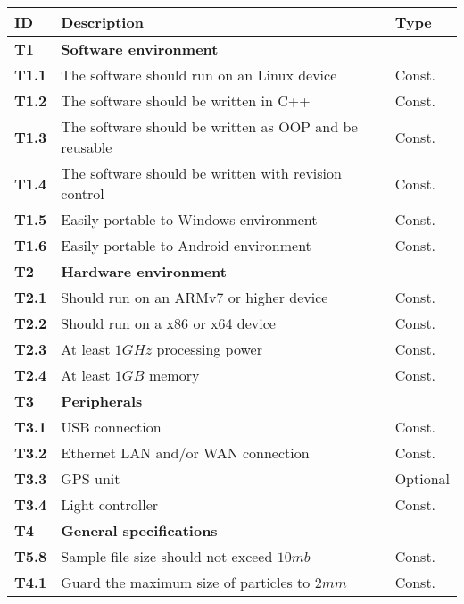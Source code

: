 \documentclass[11pt,fleqn,,a4paper,twoside,openright]{book}
\begin{document}
\begin{longtable}{|p{1cm}| p{10cm} p{1.5cm}|}
\hline 
\textbf{ID} & \textbf{Description} & \textbf{Type} \\ 
\endhead
\hline 
\textbf{T1}\label{T1} & \textbf{Software environment} &  \\ 
\hline 
\textbf{T1.1}\label{T1.1} & The software should run on an Linux device & Const. \\ 
\hline 
\textbf{T1.2}\label{T1.2} & The software should be written in C++ & Const. \\ 
\hline 
\textbf{T1.3}\label{T1.3} & The software should be written as OOP and be reusable & Const. \\ 
\hline 
\textbf{T1.4}\label{T1.4} & The software should be written with revision control & Const. \\
\hline 
\textbf{T1.5}\label{T1.5} & Easily portable to Windows environment & Const. \\
\hline 
\textbf{T1.6}\label{T1.6} & Easily portable to Android environment & Const. \\
\hline 
\textbf{T2}\label{T2} & \textbf{Hardware environment} &  \\ 
\hline 
\textbf{T2.1}\label{T2.1} & Should run on an ARMv7 or higher device &  Const. \\ 
\hline 
\textbf{T2.2}\label{T2.2} & Should run on a x86 or x64 device & Const. \\
\hline 
\textbf{T2.3}\label{T2.3} & At least $1 GHz$ processing power & Const. \\
\hline 
\textbf{T2.4}\label{T2.4} & At least $1 GB$ memory & Const. \\
\hline 
\textbf{T3}\label{T3} & \textbf{Peripherals}  &  \\ 
\hline 
\textbf{T3.1}\label{T3.1} & USB connection  & Const. \\ 
\hline 
\textbf{T3.2}\label{T3.2} & Ethernet LAN and/or WAN connection  & Const. \\ 
\hline 
\textbf{T3.3}\label{T3.3} & GPS unit & Optional  \\ 
\hline 
\textbf{T3.4}\label{T3.4} & Light controller & Const. \\
\hline 
\textbf{T4}\label{T4} & \textbf{General specifications} &  \\ 
\hline 
\textbf{T5.8}\label{T4.1} & Sample file size should not exceed $ 10 mb $ & Const. \\
\hline 
\textbf{T4.1}\label{T4.2} & Guard the maximum size of particles to $ 2 mm $ & Const.	
\end{longtable} 
\end{document}
